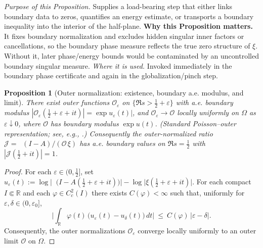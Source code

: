 \documentclass[11pt]{article}
\newtheorem{proposition}{Proposition}[section]
\theoremstyle{definition}
\theoremstyle{remark}
\newcommand{\R}{\mathbb{R}}
\DeclareMathOperator{\dettwo}{det_2}
\begin{document}
\vspace{1.0cm}
\noindent \textit{Purpose of this Proposition.} Supplies a load-bearing step that either links boundary data to zeros, quantifies an energy estimate, or transports a boundary inequality into the interior of the half-plane.
\noindent\textbf{Why this Proposition matters.} It fixes boundary normalization and excludes hidden singular inner factors or cancellations, so the boundary phase measure reflects the true zero structure of $\xi$. Without it, later phase/energy bounds would be contaminated by an uncontrolled boundary singular measure.
\noindent\textit{Where it is used.} Invoked immediately in the boundary phase certificate and again in the globalization/pinch step.
\begin{proposition}[Outer normalization: existence, boundary a.e. modulus, and limit]\label{prop:outer-central}
There exist outer functions \(\mathcal O_\varepsilon\) on \(\{\Re s>\tfrac12+\varepsilon\}\) with a.e. boundary modulus \(|\mathcal O_\varepsilon(\tfrac12+\varepsilon+it)|=\exp u_\varepsilon(t)|\), and \(\mathcal O_\varepsilon\to\mathcal O\) locally uniformly on \(\Omega\) as \(\varepsilon\downarrow 0\), where \(\mathcal O\) has boundary modulus \(\exp u(t)\). (Standard Poisson–outer representation; see, e.g., \cite{Garnett,RosenblumRovnyak}.) Consequently the outer-normalized ratio \(\mathcal J=\dettwo(I-A)/(\mathcal O\,\xi)\) has a.e. boundary values on \(\Re s=\tfrac12\) with \(|\mathcal J(\tfrac12+it)|=1\).
\end{proposition}
\begin{proof}
For each $\varepsilon\in(0,\tfrac12]$, set $u_\varepsilon(t):=\log\Big|\dettwo\!\big(I\! -\!A(\tfrac12\!+\!\varepsilon\!+\!it)\big)\Big|\! -\!\log\big|\xi(\tfrac12\!+\!\varepsilon\!+\!it)\big|$. For each compact $I\Subset\R$ and each $\varphi\in C_c^2(I)$ there exists $C(\varphi)<\infty$ such that, uniformly for $\varepsilon,\delta\in(0,\varepsilon_0]$,
\[\Big|\int_{\R} \varphi(t)\,\big(u_\varepsilon(t)-u_\delta(t)\big)\,dt\Big|\ \le\ C(\varphi)\,|\varepsilon-\delta|.\]
Consequently, the outer normalizations $\mathcal O_\varepsilon$ converge locally uniformly to an outer limit $\mathcal O$ on $\Omega$.
\end{proof}
\end{document}
